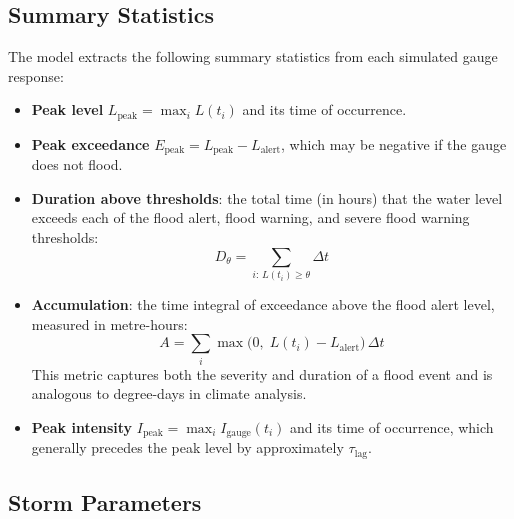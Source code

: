 \documentclass[11pt,a4paper]{article}
\begin{document}
\subsection{Summary Statistics}
\label{sec:summary_stats}

The model extracts the following summary statistics from each simulated gauge
response:

\begin{itemize}[nosep]
    \item \textbf{Peak level} $L_{\text{peak}} = \max_i L(t_i)$ and its time of
          occurrence.
    \item \textbf{Peak exceedance} $E_{\text{peak}} = L_{\text{peak}} - L_{\text{alert}}$,
          which may be negative if the gauge does not flood.
    \item \textbf{Duration above thresholds}: the total time (in hours) that the
          water level exceeds each of the flood alert, flood warning, and severe
          flood warning thresholds:
          \begin{equation}
              D_{\theta} = \sum_{i:\, L(t_i) \geq \theta} \Delta t
              \label{eq:duration}
          \end{equation}
    \item \textbf{Accumulation}: the time integral of exceedance above the flood
          alert level, measured in metre-hours:
          \begin{equation}
              A = \sum_{i} \max\!\bigl(0,\; L(t_i) - L_{\text{alert}}\bigr)\,\Delta t
              \label{eq:accumulation}
          \end{equation}
          This metric captures both the severity and duration of a flood event and
          is analogous to degree-days in climate analysis.
    \item \textbf{Peak intensity} $I_{\text{peak}} = \max_i I_{\text{gauge}}(t_i)$
          and its time of occurrence, which generally precedes the peak level by
          approximately $\tau_{\text{lag}}$.
\end{itemize}

\mkminputs

\subsection{Storm Parameters}
\end{document}
